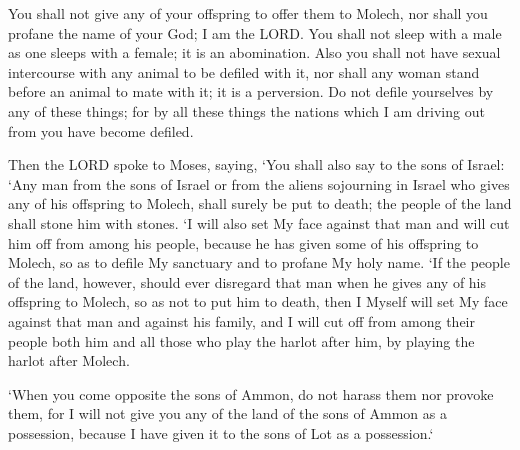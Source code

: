 \vspace{1\baselineskip}

\begin{scripture}[Leviticus 18:21-24]
    You shall not give any of your offspring to offer them to Molech, nor shall you profane the name of your God; I am the LORD.
    You shall not sleep with a male as one sleeps with a female; it is an abomination.
    Also you shall not have sexual intercourse with any animal to be defiled with it, nor shall any woman stand before an animal to mate with it; it is a perversion.
    Do not defile yourselves by any of these things; for by all these things the nations which I am driving out from you have become defiled.
\end{scripture}

\vspace{1\baselineskip}

\begin{scripture}[Leviticus 20:1-5]
    Then the LORD spoke to Moses, saying, 
    `You shall also say to the sons of Israel: `Any man from the sons of Israel or from the aliens sojourning in Israel who gives any of his offspring to Molech, 
    shall surely be put to death; the people of the land shall stone him with stones.
    `I will also set My face against that man and will cut him off from among his people, because he has given some of his offspring to Molech, so as to defile My sanctuary and to profane My holy name.
    `If the people of the land, however, should ever disregard that man when he gives any of his offspring to Molech, so as not to put him to death,
    then I Myself will set My face against that man and against his family, and I will cut off from among their people both him and all those who play the harlot after him, by playing the harlot after Molech.
\end{scripture}
\vspace{1\baselineskip}

\begin{scripture}[Deuteronomy 2:19]
    `When you come opposite the sons of Ammon, do not harass them nor provoke them, for I will not give you any of the land of the sons of Ammon as a possession, because I have given it to the sons of Lot as a possession.`
\end{scripture}

